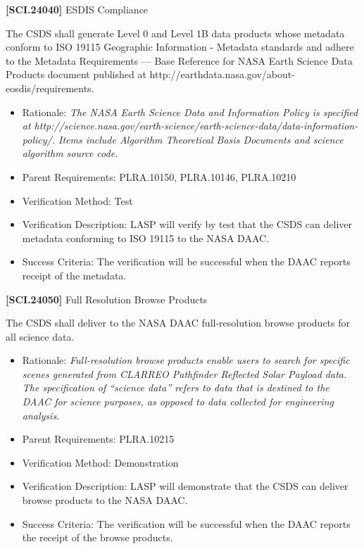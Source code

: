 \documentclass[12pt,oneside,oldfontcommands]{memoir}
\begin{document}
\textbf{[SCI.24040]} \gls{ESDIS} Compliance

The \gls{CSDS} shall generate Level 0 and Level 1B data products whose metadata conform to ISO 19115 Geographic Information - Metadata standards and adhere to the Metadata Requirements --- Base Reference for NASA Earth Science Data Products document published at http:\slash \slash earthdata.nasa.gov\slash about-eosdis\slash requirements.

\begin{itemize}
\item{} Rationale: \emph{The NASA Earth Science Data and Information Policy is specified at http:\slash \slash science.nasa.gov\slash earth-science\slash earth-science-data\slash data-information-policy\slash . Items include Algorithm Theoretical Basis Documents and science algorithm source code.}

\item{} Parent Requirements: PLRA.10150, PLRA.10146, PLRA.10210

\item{} Verification Method: Test

\item{} Verification Description: \gls{LASP} will verify by \gls{test} that the \gls{CSDS} can deliver metadata conforming to ISO 19115 to the NASA \gls{DAAC}.

\item{} Success Criteria: The verification will be successful when the \gls{DAAC} reports receipt of the metadata.

\end{itemize}

\textbf{[SCI.24050]} Full Resolution Browse Products

The \gls{CSDS} shall deliver to the NASA \gls{DAAC} full-resolution browse products for all science data.

\begin{itemize}
\item{} Rationale: \emph{Full-resolution browse products enable users to search for specific scenes generated from CLARREO Pathfinder Reflected Solar Payload data. The specification of ``science data'' refers to data that is destined to the DAAC for science purposes, as opposed to data collected for engineering analysis.}

\item{} Parent Requirements: PLRA.10215

\item{} Verification Method: Demonstration

\item{} Verification Description: \gls{LASP} will demonstrate that the \gls{CSDS} can deliver browse products to the NASA \gls{DAAC}.

\item{} Success Criteria: The verification will be successful when the \gls{DAAC} reports the receipt of the browse products.

\end{itemize}
\end{document}
